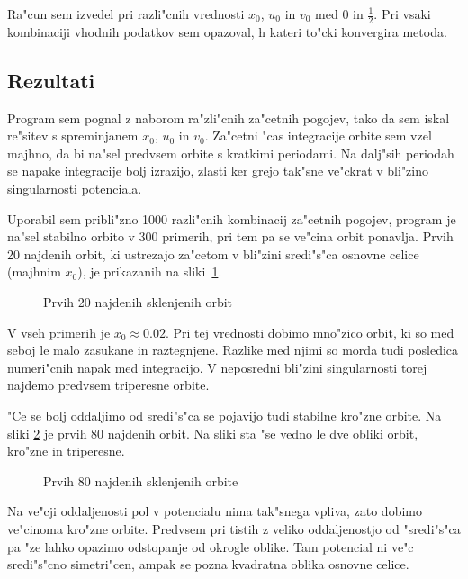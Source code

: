 \documentclass[a4paper,10pt]{article}
\begin{document}
Ra"cun sem izvedel pri razli"cnih vrednosti $x_0$, $u_0$ in $v_0$ med 0 in $\frac{1}{2}$. Pri vsaki kombinaciji vhodnih podatkov sem opazoval, h kateri to"cki konvergira metoda. 

\subsection{Rezultati}

Program sem pognal z naborom ra"zli"cnih za"cetnih pogojev, tako da sem iskal re"sitev s spreminjanem $x_0$, $u_0$ in $v_0$. Za"cetni "cas integracije orbite sem vzel majhno, da bi na"sel predvsem orbite s kratkimi periodami. Na dalj"sih periodah se napake integracije bolj izrazijo, zlasti ker grejo tak"sne ve"ckrat v bli"zino singularnosti potenciala.

Uporabil sem pribli"zno 1000 razli"cnih kombinacij za"cetnih pogojev, program je na"sel stabilno orbito v 300 primerih, pri tem pa se ve"cina orbit ponavlja. Prvih 20 najdenih orbit, ki ustrezajo za"cetom v bli"zini sredi"s"ca osnovne celice (majhnim $x_0$), je prikazanih na sliki~\ref{fig:orbite-ena}.

\begin{figure}[H]
 \centering
 
 \caption{Prvih 20 najdenih sklenjenih orbit}
 \label{fig:orbite-ena}
\end{figure}

V vseh primerih je $x_0 \approx 0.02$. Pri tej vrednosti dobimo mno"zico orbit, ki so med seboj le malo zasukane in raztegnjene. Razlike med njimi so morda tudi posledica numeri"cnih napak med integracijo. V neposredni bli"zini singularnosti torej najdemo predvsem triperesne orbite. 

"Ce se bolj oddaljimo od sredi"s"ca se pojavijo tudi stabilne kro"zne orbite. Na sliki \ref{fig:orbite-dva} je prvih 80 najdenih orbit. Na sliki sta "se vedno le dve obliki orbit, kro"zne in triperesne. 

\begin{figure}[H]
 \centering
 
 \caption{Prvih 80 najdenih sklenjenih orbite}
 \label{fig:orbite-dva}
\end{figure}

Na ve"cji oddaljenosti pol v potencialu nima tak"snega vpliva, zato dobimo ve"cinoma kro"zne orbite. Predvsem pri tistih z veliko oddaljenostjo od "sredi"s"ca pa "ze lahko opazimo odstopanje od okrogle oblike. Tam potencial ni ve"c sredi"s"cno simetri"cen, ampak se pozna kvadratna oblika osnovne celice. 
\end{document}
